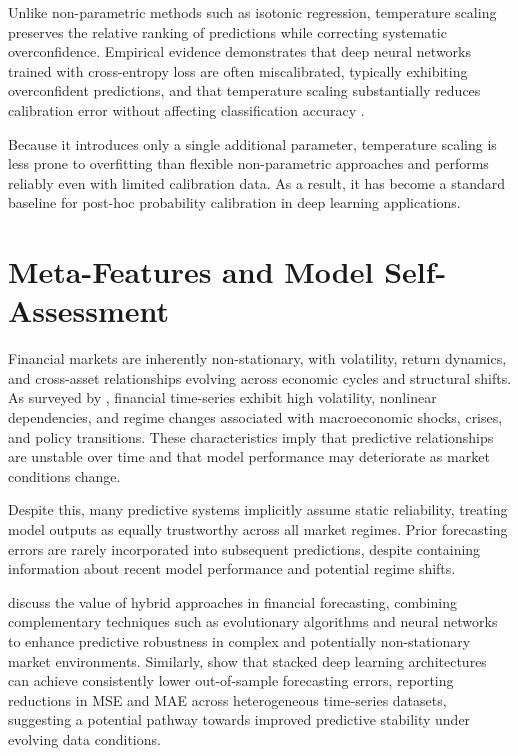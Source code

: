 \documentclass{l4proj}
\begin{document}
Unlike non-parametric methods such as isotonic regression, temperature scaling preserves the relative ranking of predictions while correcting systematic overconfidence. Empirical evidence demonstrates that deep neural networks trained with cross-entropy loss are often miscalibrated, typically exhibiting overconfident predictions, and that temperature scaling substantially reduces calibration error without affecting classification accuracy \cite{guo2017calibrationmodernneuralnetworks}.

Because it introduces only a single additional parameter, temperature scaling is less prone to overfitting than flexible non-parametric approaches and performs reliably even with limited calibration data. As a result, it has become a standard baseline for post-hoc probability calibration in deep learning applications. 

\section{Meta-Features and Model Self-Assessment}

Financial markets are inherently non-stationary, with volatility, return dynamics, and cross-asset relationships evolving across economic cycles and structural shifts. As surveyed by \citet{repec:eee:empfin:v:9:y:2002:i:5:p:495-510}, financial time-series exhibit high volatility, nonlinear dependencies, and regime changes associated with macroeconomic shocks, crises, and policy transitions. These characteristics imply that predictive relationships are unstable over time and that model performance may deteriorate as market conditions change.

Despite this, many predictive systems implicitly assume static reliability, treating model outputs as equally trustworthy across all market regimes. Prior forecasting errors are rarely incorporated into subsequent predictions, despite containing information about recent model performance and potential regime shifts.

\cite{repec:eee:empfin:v:9:y:2002:i:5:p:495-510} discuss the value of hybrid approaches in financial forecasting, combining complementary techniques such as evolutionary algorithms and neural networks to enhance predictive robustness in complex and potentially non-stationary market environments. Similarly, \cite{VARSHNEY2024123487} show that stacked deep learning architectures can achieve consistently lower out-of-sample forecasting errors, reporting reductions in MSE and MAE across heterogeneous time-series datasets, suggesting a potential pathway towards improved predictive stability under evolving data conditions.
\end{document}
